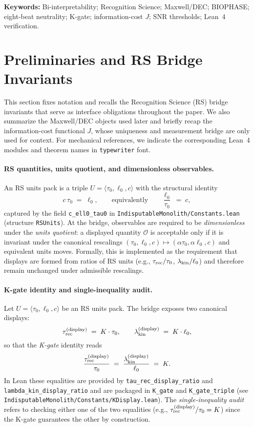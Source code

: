 \documentclass[12pt,a4paper]{article}
\begin{document}
\noindent\textbf{Keywords:} Bi-interpretability; Recognition Science; Maxwell/DEC; BIOPHASE; eight-beat neutrality; K-gate; information-cost \(J\); SNR thresholds; Lean~4 verification.

\section{Preliminaries and RS Bridge Invariants}
\label{sec:preliminaries}

This section fixes notation and recalls the Recognition Science (RS) bridge invariants that serve as interface obligations throughout the paper. We also summarize the Maxwell/DEC objects used later and briefly recap the information-cost functional \(J\), whose uniqueness and measurement bridge are only used for context. For mechanical references, we indicate the corresponding Lean~4 modules and theorem names in \texttt{typewriter} font.

\paragraph{RS quantities, units quotient, and dimensionless observables.}
An RS units pack is a triple \(U=\langle \tau_0,\ell_0,c\rangle\) with the structural identity
\begin{equation}
  c\,\tau_0 \;=\; \ell_0,
  \qquad\text{equivalently}\qquad
  \frac{\ell_0}{\tau_0} \;=\; c,
\end{equation}
captured by the field \texttt{c\_ell0\_tau0} in \texttt{IndisputableMonolith/Constants.lean} (structure \texttt{RSUnits}). At the bridge, observables are required to be \emph{dimensionless} under the \emph{units quotient}: a displayed quantity \(\mathcal{O}\) is acceptable only if it is invariant under the canonical rescalings \((\tau_0,\ell_0,c)\mapsto (\alpha\tau_0,\alpha\ell_0,c)\) and equivalent units moves. Formally, this is implemented as the requirement that displays are formed from ratios of RS units (e.g., \(\tau_{\rm rec}/\tau_0\), \(\lambda_{\rm kin}/\ell_0\)) and therefore remain unchanged under admissible rescalings.

\paragraph{K-gate identity and single-inequality audit.}
Let \(U=\langle\tau_0,\ell_0,c\rangle\) be an RS units pack. The bridge exposes two canonical displays:
\[
  \tau_{\rm rec}^{\rm (display)} \;=\; K\cdot \tau_0,
  \qquad
  \lambda_{\rm kin}^{\rm (display)} \;=\; K\cdot \ell_0,
\]
so that the \emph{K-gate} identity reads
\begin{equation}
  \frac{\tau_{\rm rec}^{\rm (display)}}{\tau_0}
  \;=\;
  \frac{\lambda_{\rm kin}^{\rm (display)}}{\ell_0}
  \;=\; K.
\end{equation}
In Lean these equalities are provided by \texttt{tau\_rec\_display\_ratio} and \texttt{lambda\_kin\_display\_ratio} and are packaged in \texttt{K\_gate} and \texttt{K\_gate\_triple} (see \texttt{IndisputableMonolith/Constants/KDisplay.lean}). The \emph{single-inequality audit} refers to checking either one of the two equalities (e.g., \(\tau_{\rm rec}^{\rm (display)}/\tau_0 = K\)) since the K-gate guarantees the other by construction.
\end{document}
